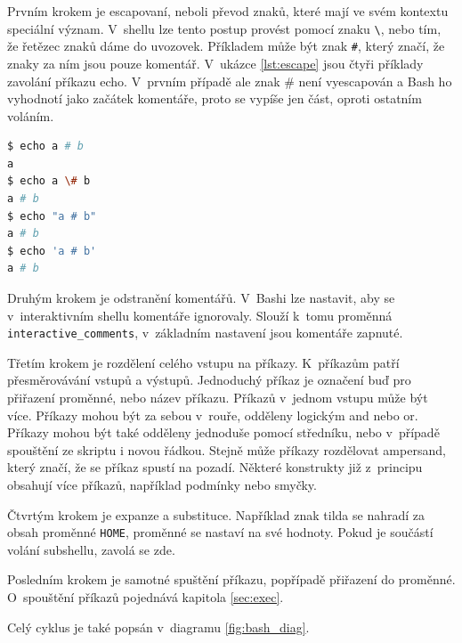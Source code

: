 \documentclass[thesis=M,czech]{FITthesis}[2012/06/26]
\begin{document}
Prvním krokem je escapovaní, neboli převod znaků, které mají ve svém kontextu speciální význam. V~shellu lze tento postup provést pomocí znaku \texttt{\textbackslash}, nebo tím, že řetězec znaků dáme do uvozovek. Příkladem může být znak \texttt{\#}, který značí, že znaky za ním jsou pouze komentář. V~ukázce \ref{lst:escape} jsou čtyři příklady zavolání příkazu echo. V~prvním případě ale znak \# není vyescapován a Bash ho vyhodnotí jako začátek komentáře, proto se vypíše jen část, oproti ostatním voláním.

\noindent
\begin{minipage}{\linewidth}
\begin{lstlisting}[language=bash, caption={Escapovaní v~shellu}, label={lst:escape}]
$ echo a # b
a
$ echo a \# b
a # b
$ echo "a # b"
a # b
$ echo 'a # b'
a # b
\end{lstlisting}
\end{minipage}

Druhým krokem je odstranění komentářů. V~Bashi lze nastavit, aby se v~interaktivním shellu komentáře ignorovaly. Slouží k~tomu proměnná \texttt{interactive\_comments}, v~základním nastavení jsou komentáře zapnuté.

Třetím krokem je rozdělení celého vstupu na příkazy. K~příkazům patří přesměrovávání vstupů a výstupů. Jednoduchý příkaz je označení buď pro přiřazení proměnné, nebo název příkazu. Příkazů v~jednom vstupu může být více. Příkazy mohou být za sebou v~rouře, odděleny logickým and nebo or. Příkazy mohou být také odděleny jednoduše pomocí středníku, nebo v~případě spouštění ze skriptu i novou řádkou. Stejně může příkazy rozdělovat ampersand, který značí,  že se příkaz spustí na pozadí. Některé konstrukty již z~principu obsahují více příkazů, například podmínky nebo smyčky.

Čtvrtým krokem je expanze a substituce. Například znak tilda se nahradí za obsah proměnné \texttt{HOME}, proměnné se nastaví na své hodnoty. Pokud je součástí volání subshellu, zavolá se zde.

Posledním  krokem je samotné spuštění příkazu, popřípadě přiřazení do proměnné. O~spouštění příkazů pojednává kapitola \ref{sec:exec}.

Celý cyklus je také popsán v~diagramu \ref{fig:bash_diag}.
\end{document}
